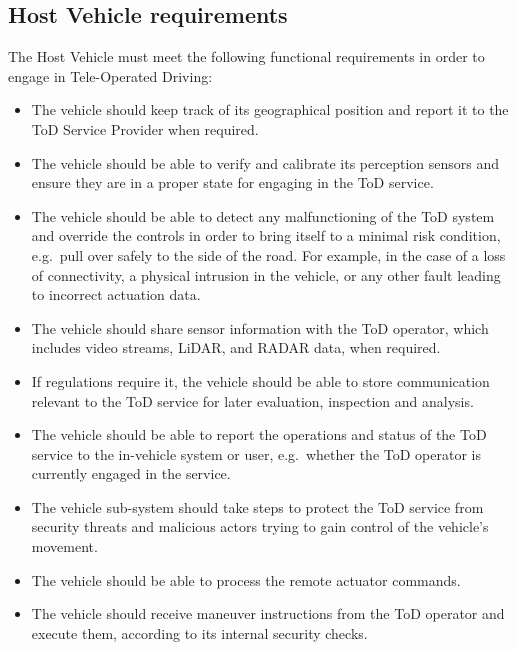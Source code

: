 \subsection{Host Vehicle requirements}
The Host Vehicle must meet the following functional requirements in order to engage in Tele-Operated Driving:
\begin{itemize}
    \item The vehicle should keep track of its geographical position and report it to the ToD Service Provider when required.
    \item The vehicle should be able to verify and calibrate its perception sensors and ensure they are in a proper state for engaging in the ToD service.
    \item The vehicle should be able to detect any malfunctioning of the ToD system and override the controls in order to bring itself to a minimal risk condition, e.g.\ pull over safely to the side of the road. For example, in the case of a loss of connectivity, a physical intrusion in the vehicle, or any other fault leading to incorrect actuation data.
    \item The vehicle should share sensor information with the ToD operator, which includes video streams, LiDAR, and RADAR data, when required.
    \item If regulations require it, the vehicle should be able to store communication relevant to the ToD service for later evaluation, inspection and analysis.
    \item The vehicle should be able to report the operations and status of the ToD service to the in-vehicle system or user, e.g.\ whether the ToD operator is currently engaged in the service.
    \item The vehicle sub-system should take steps to protect the ToD service from security threats and malicious actors trying to gain control of the vehicle's movement.
    \item The vehicle should be able to process the remote actuator commands.
    \item The vehicle should receive maneuver instructions from the ToD operator and execute them, according to its internal security checks.
\end{itemize}

